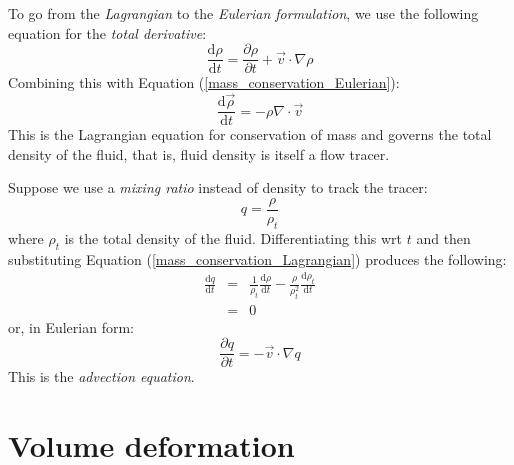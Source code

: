 \documentclass[11pt]{article}
\begin{document}
To go from the {\it Lagrangian} to the {\it Eulerian formulation}, 
we use the following equation for the {\it total derivative}:
\begin{equation}
\frac{\mathrm d \rho}{\mathrm d t}
 = \frac{\partial \rho}{\partial t} + \vec v \cdot \nabla \rho
\end{equation}
Combining this with Equation (\ref{mass_conservation_Eulerian}):
\begin{equation}
\frac{\mathrm d \vec \rho}{\mathrm d t} =  - \rho \nabla \cdot \vec v
\label{mass_conservation_Lagrangian}
\end{equation}
This is the Lagrangian equation for conservation of mass and governs the total density
of the fluid, that is, fluid density is itself a flow tracer.

Suppose we use a {\it mixing ratio} instead of density to track the
tracer:
\begin{equation}
q = \frac {\rho}{\rho_t}
\end{equation}
where $\rho_t$ is the total density of the fluid.  Differentiating this wrt
$t$ and then substituting Equation (\ref{mass_conservation_Lagrangian})
produces the following:
\begin{eqnarray}
\frac{\mathrm d q}{\mathrm d t} & = & \frac{1}{\rho_t} \frac{\mathrm d \rho}{\mathrm d t}
	- \frac{\rho}{\rho_t^2}\frac{\mathrm d \rho_t}{\mathrm d t}\\
& = & 0
\end{eqnarray}
or, in Eulerian form:
\begin{equation}
\frac{\partial q}{\partial t} = - \vec v \cdot \nabla q
\end{equation}
This is the {\it advection equation}.

\section{Volume deformation}

\label{deformation_section}
\end{document}
